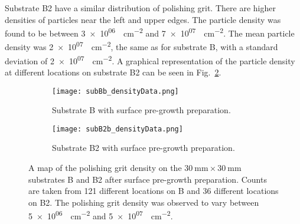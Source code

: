 Substrate B2 have a similar distribution of polishing grit. There are higher densities of particles near the left and upper edges. The particle density was found to be between \SI{3e+06}{\particle\centi\metre^{-2}} and \SI{7e+07}{\particle\centi\metre^{-2}}. The mean particle density was \SI{2e+07}{\particle\centi\metre^{-2}}, the same as for substrate B, with a standard deviation of \SI{2e+07}{\particle\centi\metre^{-2}}. A graphical representation of the particle density at different locations on substrate B2 can be seen in Fig.~\ref{fig:subB2b_densityData}.

\begin{figure}[htbp]
    \centering
    \begin{subfigure}[t]{0.8\textwidth}
        \centering
        \texttt{[image: subBb\_densityData.png]}
        \caption{Substrate B with surface pre-growth preparation.}\label{fig:subBb_densityData}
    \end{subfigure}
    \par\bigskip
    \begin{subfigure}[t]{0.8\textwidth}
        \centering
        \texttt{[image: subB2b\_densityData.png]}
        \caption{Substrate B2 with surface pre-growth preparation.}\label{fig:subB2b_densityData}
    \end{subfigure}
    \caption[Map of the polishing grit density on substrate B and B2 after surface pre-growth preparation.]{A map of the polishing grit density on the $\SI{30}{\milli\metre}\times\SI{30}{\milli\metre}$ substrates B and B2 after surface pre-growth preparation. Counts are taken from 121 different locations on B and 36 different locations on B2. The polishing grit density was observed to vary between \SI{5e+06}{\particle\centi\metre^{-2}} and \SI{5e+07}{\particle\centi\metre^{-2}}.}
    \label{fig:subBb_and_subB2b_densityData}
\end{figure}


